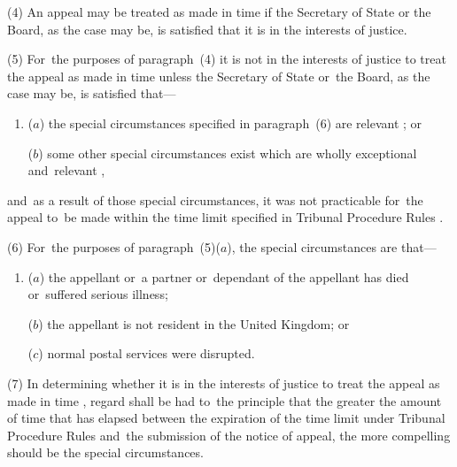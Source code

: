 \documentclass[12pt,a4paper]{article}
\begin{document}
(4) An appeal may be treated as made in time if the Secretary of State
or the Board, as the case may be, is satisfied that it is in the interests of justice.

(5) For~the purposes of paragraph~(4) it is not in the interests of justice to 
treat the appeal as made in time unless   %
the Secretary of State or~the Board, as the case may be,  %
is satisfied that—
\begin{enumerate}\item[]
($a$) the special circumstances specified in paragraph~(6) are relevant%
; or

($b$) some other special circumstances exist which are wholly exceptional and~relevant%
,
\end{enumerate}
and~as a result of those special circumstances, it was not practicable for~the 
appeal to~be made  %
within the time limit specified in 
Tribunal Procedure Rules%
.

(6) For~the purposes of paragraph~(5)($a$), the special circumstances are that—
\begin{enumerate}\item[]
($a$) the 
appellant  %
or~a 
partner  %
or~dependant of the 
appellant  %
has died or~suffered serious illness;

($b$) the 
appellant  %
is not resident in the United Kingdom; or

($c$) normal postal services were disrupted.
\end{enumerate}

(7) In determining whether it is in the interests of justice to 
treat the appeal as made in time%
, 
regard shall be had  %
to~the principle that the greater the amount of time that has elapsed between the expiration of the time 
limit under Tribunal Procedure Rules and~the submission of the notice of appeal, the more compelling should be the special circumstances.  %
\end{document}
